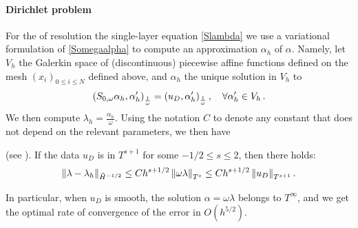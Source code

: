 \documentclass[a4paper]{article}
\begin{document}
\paragraph{Dirichlet problem} For the of resolution the single-layer equation \eqref{Slambda} we use a variational formulation of \eqref{Somegaalpha} 
to compute an approximation $\alpha_h$ of $\alpha$. Namely, let $V_h$ the Galerkin space of (discontinuous) piecewise affine functions 
defined on the mesh $(x_i)_{0\leq i \leq N}$ defined above, and $\alpha_h$ the unique solution in $V_h$ to
\[ \left( S_{0,\omega} \alpha_h,\alpha_h'\right)_\frac{1}{\omega} = \left( u_D,\alpha_h'\right)_\frac{1}{\omega}, \quad \forall \alpha_h' \in V_h\,.\]
We then compute $\lambda_h = \frac{\alpha_h}{\omega}$. Using the notation $C$ to denote any constant that does not depend on the relevant parameters, we then have
\begin{theorem}(see \cite{averseng}).
	If the data $u_D$ is in $T^{s+1}$ for some $-1/2 \leq s \leq 2$, then there holds:
	\[ \left\|\lambda - \lambda_h\right\|_{\tilde{H}^{-1/2}} \leq C h^{s+1/2} \left\|\omega \lambda\right\|_{T^{s}}\leq C h^{s+1/2} \left\|u_D\right\|_{T^{s+1}}.\]
	\label{theOrdreCVDirichlet}
\end{theorem}
In particular, when $u_D$ is smooth, the solution $\alpha = \omega \lambda$ belongs to $T^{\infty}$, and we get the optimal rate of convergence of the error in  
$O(h^{5/2})$.
\end{document}
